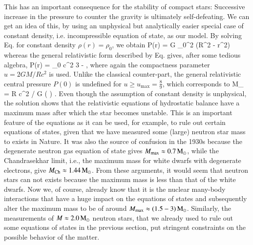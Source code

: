 This has an important consequence for the stability of compact stars:
Successive increase in the pressure to counter the gravity is ultimately self-defeating.
We can get an idea of this, by using an unphysical but analytically easier special case of constant density, i.e. incompressible equation of state, as our model.
By solving Eq. for constant density $\rho(r) = \rho_0$, we obtain
\be
P(r) = G  \rho_0^2 (R^2 - r^2)
\ee
whereas the general relativistic form described by Eq. gives, after some tedious algebra,
\be
P(r) = \rho_0 c^2  
                          { 3 -  },
\ee
where again the compactness parameter $u = 2GM/Rc^2$ is used.
Unlike the classical counter-part, the general relativistic central pressure $P(0)$ is undefined for $u \ge u_{\mathrm{max}}=\frac{8}{9}$, which corresponds to
\be
M_{} =  R c^2 / G  \left(  \right) \Msun.
\ee
Even though the assumption of constant density is unphysical, the solution shows that the relativistic equations of hydrostatic balance have a maximum mass after which the star becomes unstable.
This is an important feature of the equations as it can be used, for example, to rule out certain equations of states, given that we have measured some (large) neutron star mass to exists in Nature.
It was also the source of confusion in the 1930s because the degenerate neutron gas equation of state gives $M_{\mathrm{max}} \approx 0.7 \, \mathrm{M}_{\odot}$, while the Chandrasekhar limit, i.e., the maximum mass for white dwarfs with degenerate electrons, give $M_{\mathrm{Ch}} \approx 1.44 \, \mathrm{M}_{\odot}$.
From these arguments, it would seem that neutron stars can not exists because the maximum mass is less than that of the white dwarfs.
Now we, of course, already know that it is the nuclear many-body interactions that have a huge impact on the equations of states and subsequently alter the maximum mass to be of around $M_{\mathrm{max}} \approx (1.5-3) \, \mathrm{M}_{\odot}$.
Similarly, the measurements of $M \approx 2.0\, \mathrm{M}_{\odot}$ neutron stars, that we already used to rule out some equations of states in the previous section, put stringent constraints on the possible behavior of the matter.



